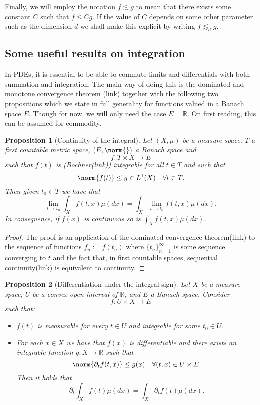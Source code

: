 \documentclass[
]{article}
\begin{document}
Finally, we will employ the notation \(f\lesssim g\) to mean that there
exists some constant \(C\) such that \(f\leq Cg\). If the value of \(C\)
depends on some other parameter such as the dimension \(d\) we shall
make this explicit by writing \(f\lesssim_d g\).

\hypertarget{some-useful-results-on-integration}{%
\subsection*{Some useful results on
integration}\label{some-useful-results-on-integration}}

In PDEs, it is essential to be able to commute limits and differentials
with both summation and integration. The main way of doing this is the
dominated and monotone convergence theorem (link) together with the
following two propositions which we state in full generality for
functions valued in a Banach space \(E\). Though for now, we will only
need the case \(E={\mathbb R}\). On first reading, this can be assumed
for commodity.

\leavevmode{}%
\textbf{Proposition 1} (Continuity of the integral). \emph{Let
\((X,\mu )\) be a measure space, \(T\) a first countable metric space,
\((E,\norm{})\) a Banach space and \[f:T\times X\to E\] such that
\(f(t)\) is (Bochner(link)) integrable for all \({t}\in{T}\) and such
that \[\norm{f(t)}\leq g\in L^1(X)\quad \forall{t}\in {T}.\] Then given
\(t_0\in T\) we have that
\[\lim_{t\to t_0}\int_X f(t,x)\mu(dx) =\int_X\lim_{t\to t_0}f(t,x)\mu(dx) .\]
In consequence, if \(f(x)\) is continuous so is
\(\int_X f(t,x) \mu(dx)\).}

\emph{Proof.} The proof is an application of the dominated convergence
theorem(link) to the sequence of functions \(f_n:=f(t_n)\) where
\(\{t_n\}_{n=1}^\infty\) is some sequence converging to \(t\) and the
fact that, in first countable spaces, sequential continuity(link) is
equivalent to continuity.~◻

\leavevmode{}%
\textbf{Proposition 2} ({Differentiation under the integral sign}).
\emph{Let \(X\) be a measure space, \(U\) be a convex open interval of
\({\mathbb R}\), and \(E\) a Banach space. Consider \[f:U\times X\to E\]
such that:}

\begin{itemize}
\item
  \emph{\(f(t)\) is measurable for every \(t\in U\) and integrable for
  some \(t_0\in U\).}
\item
  \emph{For each \(x\in X\) we have that \(f(x)\) is differentiable and
  there exists an integrable function \(g: X\to{\mathbb R}\) such that
  \[\norm{\partial_{t}{f}(t,x)}\leq g(x)\quad \forall{(t,x)}\in {U\times E}.\]
  Then it holds that
  \[\partial_{t}{\int_X f(t)\mu(dx)}=\int_X \partial_{t}f(t) \mu(dx).\]}
\end{itemize}
\end{document}

